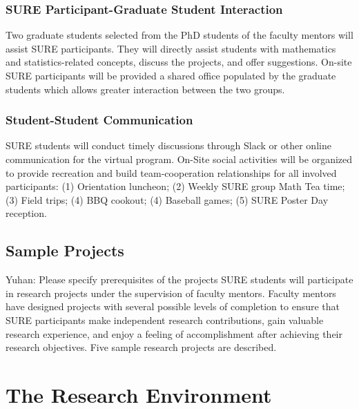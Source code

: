 \documentclass[11pt]{NSFamsart}
\newcommand{\YDNote}[1]{{\color{magenta}Yuhan: #1}}
\begin{document}
\subsubsection{SURE Participant-Graduate Student Interaction}
Two graduate students selected from the PhD students
of the faculty mentors will assist SURE participants. They will
directly assist students with mathematics and statistics-related
concepts, discuss the projects, and offer suggestions. On-site SURE participants will be provided
a shared office populated by the graduate students which
allows greater interaction between the two groups. 

\subsubsection{Student-Student Communication}
SURE students will conduct timely discussions through Slack or
other online communication for the virtual program.
On-Site social activities will be organized to provide recreation
and build team-cooperation relationships for all involved participants: (1) Orientation luncheon; (2) Weekly SURE group Math Tea time; (3) Field trips; (4) BBQ
cookout; (4) Baseball games;  (5) SURE Poster Day reception.

\subsection{ Sample Projects }
\YDNote{Please specify prerequisites of the projects}
SURE students will participate in research projects under the supervision of faculty mentors. Faculty
mentors have designed projects with several possible levels of completion to ensure that SURE participants
make independent research contributions, gain valuable research experience, and enjoy a feeling of
accomplishment after achieving their research objectives. Five sample research projects are described.
%
















\section{The Research Environment}
\end{document}
